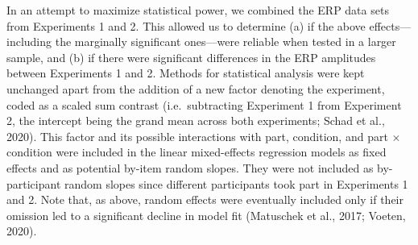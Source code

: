 \documentclass[
  english,
  man,11pt,floatsintext]{apa7}
\begin{document}
In an attempt to maximize statistical power, we combined the ERP data sets from Experiments 1 and 2. This allowed us to determine (a) if the above effects---including the marginally significant ones---were reliable when tested in a larger sample, and (b) if there were significant differences in the ERP amplitudes between Experiments 1 and 2. Methods for statistical analysis were kept unchanged apart from the addition of a new factor denoting the experiment, coded as a scaled sum contrast (i.e.~subtracting Experiment 1 from Experiment 2, the intercept being the grand mean across both experiments; Schad et al., 2020). This factor and its possible interactions with part, condition, and part × condition were included in the linear mixed-effects regression models as fixed effects and as potential by-item random slopes. They were not included as by-participant random slopes since different participants took part in Experiments 1 and 2. Note that, as above, random effects were eventually included only if their omission led to a significant decline in model fit (Matuschek et al., 2017; Voeten, 2020).
\end{document}
